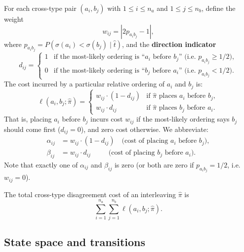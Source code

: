 \documentclass[11pt]{article}
\begin{document}
For each cross-type pair $(a_i, b_j)$ with $1 \le i \le n_a$ and $1 \le j \le n_b$, define the weight
\begin{equation}
w_{ij} = |2p_{a_i b_j} - 1|,
\end{equation}
where $p_{a_i b_j} = P(\sigma(a_i) < \sigma(b_j) \mid \hat{t})$, and the \textbf{direction indicator}
\begin{equation}
d_{ij} = \begin{cases} 1 & \text{if the most-likely ordering is ``$a_i$ before $b_j$'' (i.e.\ $p_{a_i b_j} \ge 1/2$)}, \\ 0 & \text{if the most-likely ordering is ``$b_j$ before $a_i$'' (i.e.\ $p_{a_i b_j} < 1/2$)}. \end{cases}
\end{equation}
The cost incurred by a particular relative ordering of $a_i$ and $b_j$ is:
\begin{equation}\label{eq:pair-cost}
\ell(a_i, b_j; \hat{\pi}) = \begin{cases}
w_{ij} \cdot (1 - d_{ij}) & \text{if } \hat{\pi} \text{ places } a_i \text{ before } b_j, \\
w_{ij} \cdot d_{ij} & \text{if } \hat{\pi} \text{ places } b_j \text{ before } a_i.
\end{cases}
\end{equation}
That is, placing $a_i$ before $b_j$ incurs cost $w_{ij}$ if the most-likely ordering says $b_j$ should come first ($d_{ij} = 0$), and zero cost otherwise. We abbreviate:
\begin{align}
\alpha_{ij} &= w_{ij} \cdot (1 - d_{ij}) \quad \text{(cost of placing $a_i$ before $b_j$)}, \label{eq:alpha}\\
\beta_{ij} &= w_{ij} \cdot d_{ij} \quad\;\;\;\;\;\, \text{(cost of placing $b_j$ before $a_i$)}. \label{eq:beta}
\end{align}
Note that exactly one of $\alpha_{ij}$ and $\beta_{ij}$ is zero (or both are zero if $p_{a_i b_j} = 1/2$, i.e.\ $w_{ij} = 0$).

The total cross-type disagreement cost of an interleaving $\hat{\pi}$ is
\begin{equation}\label{eq:total-cross}
\sum_{i=1}^{n_a} \sum_{j=1}^{n_b} \ell(a_i, b_j; \hat{\pi}).
\end{equation}

\subsection{State space and transitions}
\end{document}

